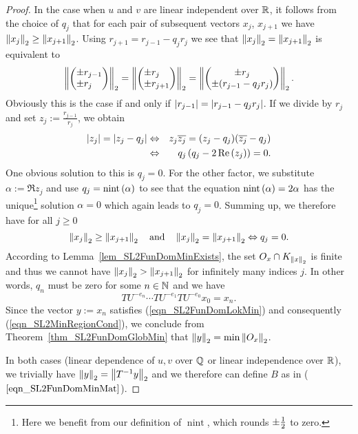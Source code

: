 \begin{proof}
In the case when $u$ and $v$ are linear independent over $\mathbb{R}$, it follows from the choice of $q_j$ that for each pair of subsequent vectors $x_j$, $x_{j+1}$ we have $\left\| x_j \right\|_2 \ge \left\| x_{j+1} \right\|_2$. Using $r_{j+1} = r_{j-1} - q_j r_j$ we see that $\left\| x_j \right\|_2 = \left\| x_{j+1} \right\|_2$ is equivalent to
\begin{equation*}
\left\| \begin{pmatrix}\pm r_{j-1} \\ \pm r_{j\phantom{-1}}\end{pmatrix} \right\|_2 = 
\left\| \begin{pmatrix}\pm r_{j\phantom{+1}} \\ \pm r_{j+1}\end{pmatrix} \right\|_2 =
\left\| \begin{pmatrix}\pm r_j \\ \pm (r_{j-1} - q_j r_j)\end{pmatrix} \right\|_2.
\end{equation*}
Obviously this is the case if and only if $\left|r_{j-1}\right| = \left|r_{j-1}-q_j r_j\right|$. If we divide by $r_j$ and set $z_j := \frac{r_{j-1}}{r_j}$, we obtain
\begin{eqnarray*}
\left|z_j\right| = \left|z_j - q_j\right| 
&\Leftrightarrow& z_j \overline{z_j} = (z_j - q_j)(\overline{z_j} -q_j)\\
&\Leftrightarrow& q_j \left(q_j - 2\operatorname{Re}\left(z_j\right)\right) = 0.
\end{eqnarray*}
One obvious solution to this is $q_j = 0$. For the other factor, we substitute $\alpha := \Re{z_j}$ and use $q_j = \operatorname{nint}\left( \alpha \right)$ to see that the equation $\operatorname{nint}\left( \alpha \right) = 2 \alpha$ has the unique\footnote{Here we benefit from our definition of $\operatorname{nint}$, which rounds $\pm \frac{1}{2}$ to zero.} solution $\alpha = 0$ which again leads to $q_j = 0$. Summing up, we therefore have for all $j \ge 0$
\begin{equation}
\label{eqn_SL2FunDomAlgNormDec}
\left\| x_j \right\|_2 \ge \left\| x_{j+1} \right\|_2 
\quad \text{and} \quad
\left\| x_j \right\|_2 = \left\| x_{j+1} \right\|_2 \Leftrightarrow q_j = 0.
\end{equation}
According to Lemma~{\ref{lem_SL2FunDomMinExists}}, the set $O_x \cap K_{\left\| x \right\|_2}$ is finite and thus we cannot have $\left\| x_j \right\|_2 > \left\| x_{j+1} \right\|_2$ for infinitely many indices $j$. In other words, $q_n$ must be zero for some $n \in \mathbb{N}$ and we have
\begin{equation*}
TU^{-e_n} \cdots TU^{-e_1} TU^{-e_0} x_0 = x_n.
\end{equation*}
Since the vector $y := x_n$ satisfies (\ref{eqn_SL2FunDomLokMin}) and consequently ({\ref{eqn_SL2MinRegionCond}}), we conclude from  Theorem~\ref{thm_SL2FunDomGlobMin} that $\left\| y \right\|_2 = \min{\left\| O_x \right\|_2}$. 

In both cases (linear dependence of $u,v$ over $\mathbb{Q}$ or linear independence over $\mathbb{R}$), we trivially have $\left\| y \right\|_2 = \left\| {T}^{-1}y \right\|_2$ and we therefore can define $B$ as in ($\ref{eqn_SL2FunDomMinMat}$).
\end{proof}

